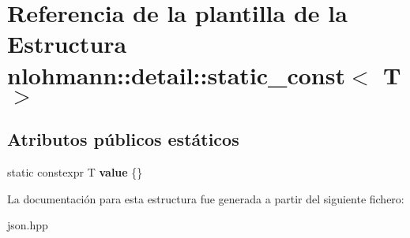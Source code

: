 \hypertarget{structnlohmann_1_1detail_1_1static__const}{}\section{Referencia de la plantilla de la Estructura nlohmann\+:\+:detail\+:\+:static\+\_\+const$<$ T $>$}
\label{structnlohmann_1_1detail_1_1static__const}
\subsection*{Atributos públicos estáticos}
\begin{DoxyCompactItemize}
\item 
\mbox{\label{structnlohmann_1_1detail_1_1static__const_a6bb7ab2ddd6abc41fb4ffb7c6dfa237e}} 
static constexpr T {\bfseries value} \{\}
\end{DoxyCompactItemize}


La documentación para esta estructura fue generada a partir del siguiente fichero\+:\begin{DoxyCompactItemize}
\item 
json.\+hpp\end{DoxyCompactItemize}
